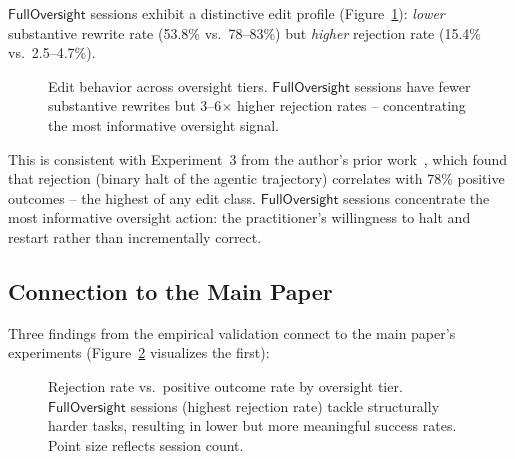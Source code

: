\documentclass[11pt]{article}
\begin{document}
$\mathsf{FullOversight}$ sessions exhibit a distinctive edit profile (Figure~\ref{fig:edit-profile}): \emph{lower} substantive rewrite rate (53.8\% vs.\ 78--83\%) but \emph{higher} rejection rate (15.4\% vs.\ 2.5--4.7\%).

\begin{figure}[t]
\centering

\caption{Edit behavior across oversight tiers. $\mathsf{FullOversight}$ sessions have fewer substantive rewrites but 3--6$\times$ higher rejection rates -- concentrating the most informative oversight signal.}
\label{fig:edit-profile}
\end{figure}
This is consistent with Experiment~3 from the author's prior work~\citep{ovcharov2025citation,ovcharov2025statute}, which found that rejection (binary halt of the agentic trajectory) correlates with 78\% positive outcomes -- the highest of any edit class.
$\mathsf{FullOversight}$ sessions concentrate the most informative oversight action: the practitioner's willingness to halt and restart rather than incrementally correct.

\subsection{Connection to the Main Paper}
\label{sec:connection}

Three findings from the empirical validation connect to the main paper's experiments (Figure~\ref{fig:rejection-outcome} visualizes the first):

\begin{figure}[t]
\centering

\caption{Rejection rate vs.\ positive outcome rate by oversight tier. $\mathsf{FullOversight}$ sessions (highest rejection rate) tackle structurally harder tasks, resulting in lower but more meaningful success rates. Point size reflects session count.}
\label{fig:rejection-outcome}
\end{figure}
\end{document}
